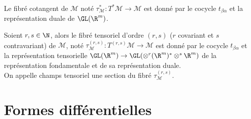 \begin{defi}
Le fibré cotangent de $\mathcal{M}$ noté $\tau^*_\mathcal{M} : T^*\mathcal{M} \to \mathcal{M}$ est donné par le cocycle $t_{\beta\alpha}$ et la représentation duale de $\GL(\R^m)$. 
\end{defi}

\begin{defi}
Soient $r,s\in \N$, alors le fibré tensoriel d'ordre $(r,s)$ ($r$ covariant et $s$ contravariant) de $\mathcal{M}$, noté $\tau^{(r,s)}_\mathcal{M} : T^{(r,s)}\mathcal{M} \to \mathcal{M}$ est donné par le cocycle $t_{\beta\alpha}$ et la représentation tensorielle $\GL(\R^m) \to \GL(\otimes^r(\R^m)^* \otimes^s\R^m)$ de la représentation fondamentale et de sa représentation duale. \\
On appelle champs tensoriel une section du fibré $\tau^{(r,s)}_\mathcal{M}$.
\end{defi}

\newpage
\section{Formes différentielles}

